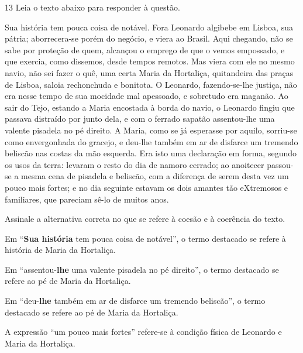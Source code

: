 \pagebreak

\num{13} Leia o texto abaixo para responder à questão. 

\begin{myquote}

Sua história tem pouca coisa de notável. Fora Leonardo
algibebe em Lisboa, sua pátria; aborrecera-se porém do negócio,
e viera ao Brasil. Aqui chegando, não se sabe por proteção de
quem, alcançou o emprego de que o vemos empossado, e que
exercia, como dissemos, desde tempos remotos. Mas viera com
ele no mesmo navio, não sei fazer o quê, uma certa Maria da
Hortaliça, quitandeira das praças de Lisboa, saloia rechonchuda e
bonitota. O Leonardo, fazendo-se-lhe justiça, não era nesse tempo
de sua mocidade mal apessoado, e sobretudo era maganão. Ao
sair do Tejo, estando a Maria encostada à borda do navio, o
Leonardo fingiu que passava distraído por junto dela, e com o
ferrado sapatão assentou-lhe uma valente pisadela no pé direito.
A Maria, como se já esperasse por aquilo, sorriu-se como
envergonhada do gracejo, e deu-lhe também em ar de disfarce um
tremendo beliscão nas costas da mão esquerda. Era isto uma
declaração em forma, segundo os usos da terra: levaram o resto
do dia de namoro cerrado; ao anoitecer passou-se a mesma cena
de pisadela e beliscão, com a diferença de serem desta vez um
pouco mais fortes; e no dia seguinte estavam os dois amantes tão
eXtremosos e familiares, que pareciam sê-lo de muitos anos.


\end{myquote}

Assinale a alternativa correta no que se refere à coesão e à coerência 
do texto. 

\begin{escolha}

\item
  Em ``\textbf{Sua história} tem pouca coisa de notável'', o termo destacado
  se refere à história de Maria da Hortaliça.
\item
  Em ``assentou-\textbf{lhe} uma valente pisadela no pé direito'', o termo destacado
  se refere ao pé de Maria da Hortaliça.
\item
  Em ``deu-\textbf{lhe} também em ar de disfarce um tremendo beliscão'', o termo 
  destacado se refere ao pé de Maria da Hortaliça.
\item
  A expressão ``um pouco mais fortes'' refere-se à condição física de Leonardo e 
  Maria da Hortaliça.

\end{escolha}

